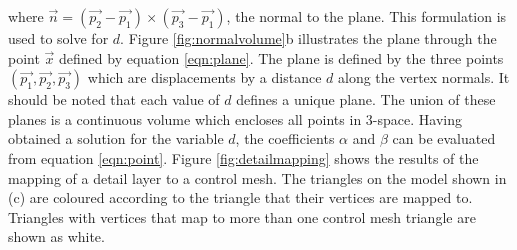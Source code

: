 \documentclass[10pt,oneside,fleqn,a4paper]{book}
\begin{document}
where $\vec{n} = (\vec{p_2}-\vec{p_1}) \times (\vec{p_3}-\vec{p_1})$, the normal to the plane. This formulation is used to solve for $d$. Figure \ref{fig:normalvolume}b illustrates the plane through the point $\vec{x}$ defined by equation \ref{eqn:plane}. The plane is defined by the three points $(\vec{p_1}, \vec{p_2}, \vec{p_3})$ which are displacements by a distance $d$ along the vertex normals. It should be noted that each value of $d$ defines a unique plane. The union of these planes is a continuous volume which encloses all points in 3-space. Having obtained a solution for the variable $d$, the coefficients $\alpha$ and $\beta$ can be evaluated from equation \ref{eqn:point}. Figure \ref{fig:detailmapping} shows the results of the mapping of a detail layer to a control mesh. The triangles on the model shown in (c) are coloured according to the triangle that their vertices are mapped to. Triangles with vertices that map to more than one control mesh triangle are shown as white.
\end{document}

